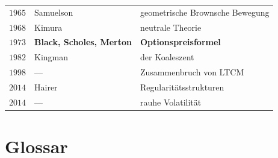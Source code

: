 \begin{merksatz}
\begin{center}
{\begin{tabular}{@{}P{1.3cm}P{3.0cm}P{4.0cm}@{}}
$1965$ & Samuelson & geometrische Brownsche Bewegung\\
$1968$ & Kimura & neutrale Theorie\\
$1973$ & \textbf{Black, Scholes, Merton} & \textbf{Optionspreisformel}\\
$1982$ & Kingman & der Koaleszent\\
$1998$ & --- & Zusammenbruch von LTCM\\
$2014$ & Hairer & Regularitätsstrukturen\\
$2014$ & --- & rauhe Volatilität\\
\bottomrule
\end{tabular}}
\end{center}
\end{merksatz}

\section{Glossar}

